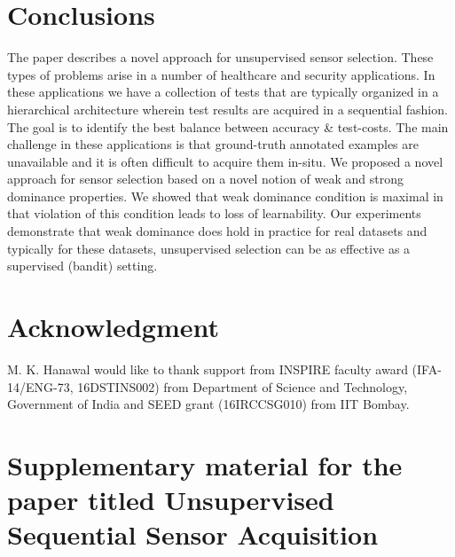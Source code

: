 \documentclass[10pt]{article}
\begin{document}
\section{Conclusions}
\label{sec:Conclu}
%
\vspace{-10pt}
The paper describes a novel approach for unsupervised sensor selection. These types of problems arise in a number of healthcare and security applications. In these applications we have a collection of tests that are typically organized in a hierarchical architecture wherein test results are acquired in a sequential fashion. The goal is to identify the best balance between accuracy \& test-costs. The main challenge in these applications is that ground-truth annotated examples are unavailable and it is often difficult to acquire them in-situ. We proposed a novel approach for sensor selection based on a novel notion of weak and strong dominance properties. We showed that weak dominance condition is maximal in that violation of this condition leads to loss of learnability. Our experiments demonstrate that weak dominance does hold in practice for real datasets and typically for these datasets, unsupervised selection can be as effective as a supervised (bandit) setting. 

\section*{Acknowledgment}
\label{sec:Ack}
M. K. Hanawal would like to thank support from INSPIRE faculty award (IFA-14/ENG-73, 16DSTINS002) from Department of Science and Technology, Government of India and SEED grant (16IRCCSG010) from IIT Bombay.
%




\newpage
\section*{\large Supplementary material for the paper titled Unsupervised Sequential Sensor Acquisition}
\hrulefill \hrulefill
\hrulefill

\end{document}
